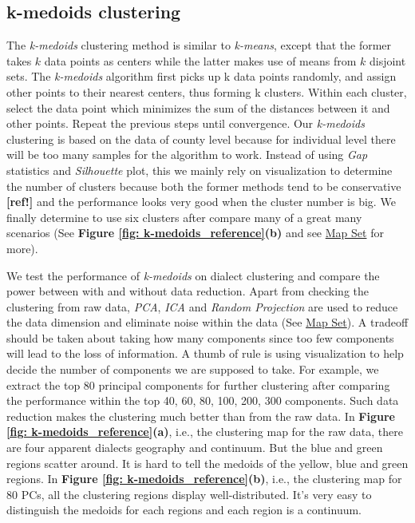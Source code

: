 \subsection{k-medoids clustering}

\qquad The \textit{k-medoids} clustering method is similar to \textit{k-means}, except that the former takes $k$ data points as centers while the latter makes use of means from $k$ disjoint sets. The \textit{k-medoids} algorithm first picks up k data points randomly, and assign other points to their nearest centers, thus forming k clusters. Within each cluster, select the data point which minimizes the sum of the distances  between it and other points. Repeat the previous steps until convergence. Our \textit{k-medoids} clustering is based on the data of county level because for individual level there will be too many samples for the algorithm to work. Instead of using \textit{Gap} statistics and \textit{Silhouette} plot, this we mainly rely on visualization to determine the number of clusters because both the former methods tend to be conservative \textbf{[ref!]} and the performance looks very good when the cluster number is big. We finally determine to use six clusters after compare many of a great many scenarios (See  \textbf{Figure \ref{fig: k-medoids_reference}(b)} and see \href{https://yeyt2718.shinyapps.io/map_Question}{Map Set} for more).

\qquad We test the performance of \textit{k-medoids} on dialect clustering and compare the power between with and without data reduction. Apart from checking the clustering from raw data, \textit{PCA}, \textit{ICA} and \textit{Random Projection} are used to reduce the data dimension and eliminate noise within the data (See \href{https://yeyt2718.shinyapps.io/map_Question}{Map Set}). A tradeoff should be taken about taking how many components since too few components will lead to the loss of information. A thumb of rule is using visualization to help decide the number of components we are supposed to take. For example, we extract the top 80 principal components for further clustering after comparing the performance within the top 40, 60, 80, 100, 200, 300 components. Such data reduction makes the clustering much better than from the raw data. In \textbf{Figure \ref{fig: k-medoids_reference}(a)}, i.e., the clustering map for the raw data, there are four apparent dialects geography and continuum. But the blue and green regions scatter around. It is hard to tell the medoids  of the yellow, blue and green regions. In \textbf{Figure \ref{fig: k-medoids_reference}(b)}, i.e., the clustering map for 80 PCs, all the clustering regions display well-distributed. It's very easy to distinguish the medoids for each regions and each region is a continuum.


